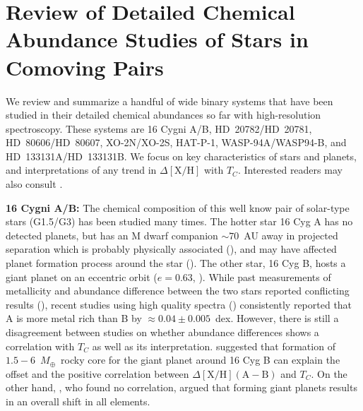 \documentclass[modern, letterpaper]{aastex61}
\newcommand*\elem[1]{\ensuremath{\mathrm{#1}}}
\newcommand*\elemH[1]{\ensuremath{[\mathrm{#1}/\elem{H}]}}
\newcommand{\Tcondens}{\ensuremath{T_C}}
\newcommand{\mearth}{\ensuremath{M_\oplus}}
\begin{document}



\appendix
\section{
  Review of Detailed Chemical Abundance Studies of Stars in Comoving Pairs}
\label{app:review}

We review and summarize a handful of
wide binary systems that have been studied in their detailed chemical
abundances so far with high-resolution spectroscopy.
These systems are
  16 Cygni A/B,
  HD~20782/HD~20781,
  HD~80606/HD~80607,
  XO-2N/XO-2S,
  HAT-P-1,
  WASP-94A/WASP94-B, and
  HD~133131A/HD~133131B.
We focus on key characteristics of stars and planets, and interpretations of
any trend in $\Delta\elemH{X}$ with \Tcondens.
Interested readers may also consult \citealt{2016arXiv161104064M}.

{\bf 16 Cygni A/B:}
The chemical composition of this well know pair of solar-type stars (G1.5/G3)
has been studied many times.
The hotter star 16 Cyg A has no detected planets, but has an M dwarf companion
$\sim 70$~AU away in projected separation which is probably physically
associated (\citealt{2002ApJ...581..654P}), and may have affected planet
formation process around the star
(\citealt{1996ApJ...458..312J,2005MNRAS.363..641M}).
The other star, 16 Cyg B, hosts a giant planet on an eccentric orbit ($e=0.63$,
\citealt{1997ApJ...483..457C}).
While past measurements of metallicity and abundance difference between the two
stars reported conflicting results
(\citealt{2001ApJ...553..405L,2011ApJ...737L..32S}), recent studies using high
quality spectra (\citealt{2011ApJ...740...76R,2014ApJ...790L..25T})
consistently reported that A is more metal rich than B by $\approx 0.04 \pm
0.005$~dex.
However, there is still a disagreement between studies on
whether abundance differences shows a correlation with $\Tcondens$ as well as
its interpretation.
\citealt{2014ApJ...790L..25T} suggested that formation of $1.5-6$~\mearth\
rocky core for the giant planet around 16 Cyg B can explain the offset and the
positive correlation between $\Delta\elemH{X} (\mathrm{A}-\mathrm{B})$
and \Tcondens. On the other hand, \citealt{2011ApJ...740...76R},
who found no correlation, argued that forming giant planets
results in an overall shift in all elements.
\end{document}

